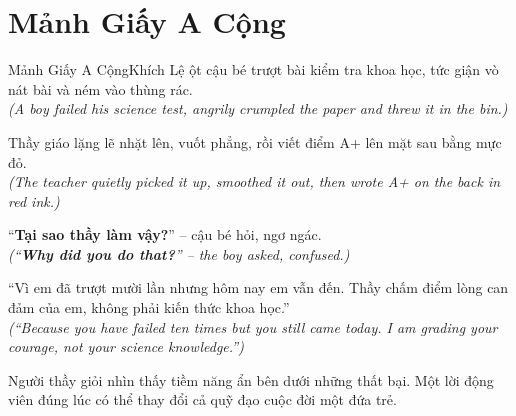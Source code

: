\section{Mảnh Giấy A Cộng}
\begin{truyen}{Mảnh Giấy A Cộng}{Khích Lệ}
ột cậu bé trượt bài kiểm tra khoa học, tức giận vò nát bài và ném vào thùng rác.\\
\textit{(A boy failed his science test, angrily crumpled the paper and threw it in the bin.)}

Thầy giáo lặng lẽ nhặt lên, vuốt phẳng, rồi viết điểm A+ lên mặt sau bằng mực đỏ.\\
\textit{(The teacher quietly picked it up, smoothed it out, then wrote A+ on the back in red ink.)}

``\textbf{Tại sao thầy làm vậy?}'' – cậu bé hỏi, ngơ ngác.\\
\textit{(``\textbf{Why did you do that?}'' – the boy asked, confused.)}

``Vì em đã trượt mười lần nhưng hôm nay em vẫn đến. Thầy chấm điểm lòng can đảm của em, không phải kiến thức khoa học.''\\
\textit{(``Because you have failed ten times but you still came today. I am grading your courage, not your science knowledge.'')}
\end{truyen}
\begin{baihoc}
  Người thầy giỏi nhìn thấy tiềm năng ẩn bên dưới những thất bại. Một lời động viên đúng lúc có thể thay đổi cả quỹ đạo cuộc đời một đứa trẻ.
\end{baihoc}

